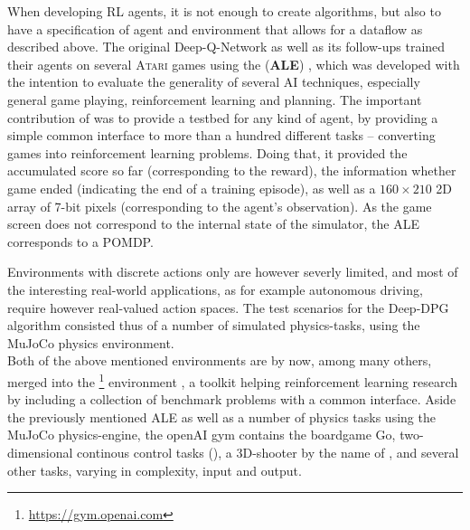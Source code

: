 When developing RL agents, it is not enough to create algorithms, but also to have a specification of agent and environment that allows for a dataflow as described above. The original Deep-Q-Network \cite{mnih_playing_2013} as well as its follow-ups \cite{van_hasselt_deep_2015}\cite{wang_dueling_2015} trained their agents on several \textsc{Atari} games using the  (\textbf{ALE}) \cite{bellemare_arcade_2012}, which was developed with the intention to evaluate the generality of several AI techniques, especially general game playing, reinforcement learning and planning. The important contribution of \cite{bellemare_arcade_2012} was to provide a testbed for any kind of agent, by providing a simple common interface to more than a hundred different tasks -- converting games into reinforcement learning problems. Doing that, it provided the accumulated score so far (corresponding to the reward), the information whether game ended (indicating the end of a training episode), as well as a $160 \times 210$  2D array of 7-bit pixels (corresponding to the agent's observation). As the game screen does not correspond to the internal state of the simulator, the ALE corresponds to a POMDP. 

Environments with discrete actions only are however severly limited, and most of the interesting real-world applications, as for example autonomous driving, require however real-valued action spaces. The test scenarios for the Deep-DPG algorithm consisted thus of a number of simulated physics-tasks, using the MuJoCo physics environment. \\

\noindent Both of the above mentioned environments are by now, among many others, merged into the \footnote{\url{https://gym.openai.com}} environment \cite{brockman_openai_2016}, a toolkit helping reinforcement learning research by including a collection of benchmark problems with a common interface. Aside the previously mentioned ALE as well as a number of physics tasks using the MuJoCo physics-engine, the openAI gym contains the boardgame Go, two-dimensional continous control tasks (), a 3D-shooter by the name of , and several other tasks, varying in complexity, input and output.

